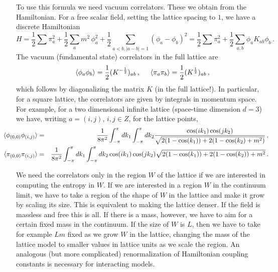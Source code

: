 \documentclass[11pt,a4paper]{article}
\numberwithin{equation}{section}
\newcommand{\be}{\begin{equation}}
\newcommand{\ee}{\end{equation}}
\begin{document}
To use this formula we need vacuum correlators. These we obtain from the Hamiltonian. For a free scalar field, setting the lattice spacing to $1$, we have a discrete Hamiltonian
\be
H=\frac{1}{2}\sum \pi _{a}^{2}+\frac{1}{2}\sum_{a}m^2\, \phi_a^2+\frac{1}{2}\sum_{a<b, |a-b|=1}    (\phi_a -\phi_{b})^2=\frac{1}{2}\sum \pi _{a}^{2}+\frac{1}{2}\sum_{a,b}\phi _{a}K_{ab}\phi
_{b}\,.
\ee
The vacuum (fundamental state) correlators in the full lattice are 
\begin{equation}
\left\langle \phi _{a}\phi _{b}\right\rangle =\frac{1}{2}(K^{-
\frac{1}{2}})_{ab}\,, \hspace{.5cm}
\left\langle \pi _{a}\pi _{b}\right\rangle =\frac{1}{2}(K^{\frac{1
}{2}})_{ab}\,, \label{p}
\end{equation}
which follows by diagonalizing the matrix $K$ (in the full lattice!). In particular, for a square lattice, the correlators are given by integrals in momentum space. For example, for a two dimensional infinite lattice (space-time dimension $d=3$) we have, writing $a=(i,j)$, $i,j \in Z$, for the lattice points,  
\begin{eqnarray}
\small
\hspace{-.7cm}\langle \phi_{(0,0)}\phi_{(i,j)}\rangle &=&\frac{1}{8\pi^2}\int_{-\pi}^{\pi}dk_1 \int_{-\pi}^{\pi}dk_2\frac{\cos(i k_1)\cos(j k_2)}{\sqrt{2
(1-\cos(k_1))+2
(1-\cos(k_2)+m^2)}}\,, \\
\hspace{-.7cm}\langle \pi_{(0,0)}\pi_{(i,j)}\rangle &=& \frac{1}{8\pi^2}\int_{-\pi}^{\pi} dk_1\int_{-\pi}^{\pi}dk_2 \cos(i k_1)\cos(j k_2)}{\sqrt{2
(1-\cos(k_1))+2
(1-\cos(k_2))+m^2}\,.
\end{eqnarray}


We need the correlators only in the region $W$ of the lattice if we are interested in computing the entropy in $W$. If we are interested in a region $W$ in the continuum limit, we have to take a region of the shape of $W$ in the lattice and make it grow by scaling its size. This is equivalent to making the lattice denser. If the field is massless and free this is all. If there is a mass, however, we have to aim for a certain fixed mass in the continuum. If the size of $W$ is $L$, then we have to take for example $L m$ fixed as we grow $W$ in the lattice, changing the mass of the lattice model to smaller values in lattice units as we scale the region. An analogous (but more complicated) renormalization of Hamiltonian coupling constants is necessary for interacting models.    
\end{document}
